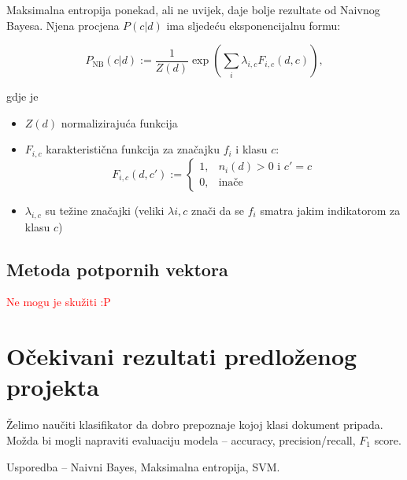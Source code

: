 \documentclass[12pt,a4paper,titlepage]{article}
\begin{document}
Maksimalna entropija ponekad, ali ne uvijek, daje bolje rezultate od Naivnog Bayesa. Njena procjena $P(c|d)$ ima sljedeću eksponencijalnu formu:

\[
  P_\text{NB}(c|d) := \frac{1}{Z(d)} \exp \left(\sum_i \lambda_{i,c} F_{i,c}(d,c)\right),
\]

gdje je

\begin{itemize}
  \item $Z(d)$ normalizirajuća funkcija
  \item $F_{i,c}$ karakteristična funkcija za značajku $f_i$ i klasu $c$:
    \[
      F_{i,c}(d,c') := \begin{cases}
                         1, & n_i(d) > 0 \text{ i } c' = c\\
                         0, & \text{inače}
                       \end{cases}
    \]
  \item $\lambda_{i,c}$ su težine značajki (veliki $\lambda{i,c}$ znači da se $f_i$ smatra jakim indikatorom za klasu $c$)
\end{itemize}

\subsection{Metoda potpornih vektora}

\textcolor{red}{Ne mogu je skužiti :P}

\section{Očekivani rezultati predloženog projekta}

Želimo naučiti klasifikator da dobro prepoznaje kojoj klasi dokument pripada. Možda bi mogli napraviti evaluaciju modela -- accuracy, precision/recall, $F_1$ score.

Usporedba -- Naivni Bayes, Maksimalna entropija, SVM.

\newpage

\nocite{*}



\end{document}
